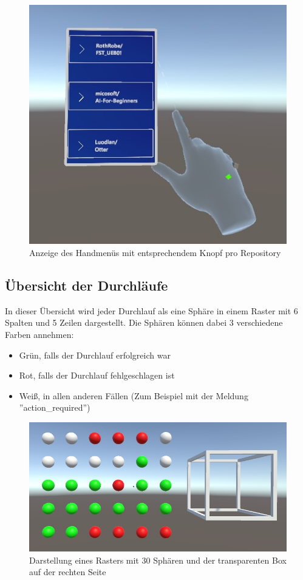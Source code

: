 \documentclass[a4paper]{article}
\begin{document}
\begin{figure}[H]
    \centering
    \includegraphics[width=.45\textwidth]{img/HandMenu.jpg}
    \caption{Anzeige des Handmenüs mit entsprechendem Knopf pro Repository}
    \label{fig:HandMenu}
\end{figure}

\subsection{Übersicht der Durchläufe}
In dieser Übersicht wird jeder Durchlauf als eine Sphäre in einem Raster mit 6 Spalten und 5 Zeilen dargestellt. Die Sphären können dabei 3 verschiedene Farben annehmen:
\begin{itemize}
    \item Grün, falls der Durchlauf erfolgreich war
    \item Rot, falls der Durchlauf fehlgeschlagen ist
    \item Weiß, in allen anderen Fällen (Zum Beispiel mit der Meldung ''action\_required'')
\end{itemize}

\begin{figure}[H]
    \centering
    \includegraphics[width=.8\textwidth]{img/ÜbersichtDurchläufe.jpg}
    \caption{Darstellung eines Rasters mit 30 Sphären und der transparenten Box auf der rechten Seite}
    \label{fig:Durchläufe}
\end{figure}
\end{document}
